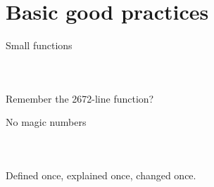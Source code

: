 \section[Good practices]{Basic good practices}

\begin{frame}[fragile]{Small functions}

    \begin{columns}[T]
        \beforelabel
        \inputminted{python}{code/good_practices/small_functions_before.py}

        \pause
        \afterlabel
        \inputminted{python}{code/good_practices/small_functions_after.py}
    \end{columns}

    \vfill

    \begin{center}
    Remember the 2672-line function?
    \end{center}
\end{frame}




\begin{frame}[fragile]{No magic numbers}

    \begin{columns}[T]
        \beforelabel
        \inputminted{python}{code/good_practices/no_magic_numbers_before.py}

        \pause
        \afterlabel
        \inputminted{python}{code/good_practices/no_magic_numbers_after.py}
    \end{columns}

    \vfill

    \begin{center}
    Defined once, explained once, changed once.
    \end{center}
\end{frame}




